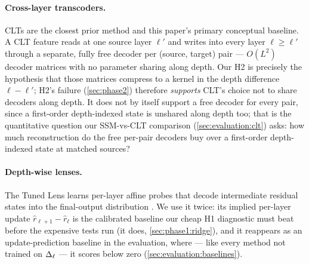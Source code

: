 \paragraph{Cross-layer transcoders.}
CLTs \citep{ameisen2025circuit} are the closest prior method and this paper's
primary conceptual baseline. A CLT feature reads at one source layer $\ell'$
and writes into every layer $\ell \ge \ell'$ through a separate, fully free
decoder per (source, target) pair --- $O(L^2)$ decoder matrices with no
parameter sharing along depth. Our H2 is precisely the hypothesis that those
matrices compress to a kernel in the depth difference $\ell-\ell'$; H2's
failure (\cref{sec:phase2}) therefore \emph{supports} CLT's choice not to
share decoders along depth. It does not by itself support a free decoder for
every pair, since a first-order depth-indexed state is unshared along depth
too; that is the quantitative question our SSM-vs-CLT comparison
(\cref{sec:evaluation:clt}) asks: how much
reconstruction do the free per-pair decoders buy over a first-order
depth-indexed state at matched sources?

\paragraph{Depth-wise lenses.}
The Tuned Lens learns per-layer affine probes that decode intermediate
residual states into the final-output distribution \citep{belrose2023tuned}.
We use it twice: its implied per-layer update
$\hat r_{\ell+1}-\hat r_\ell$ is the calibrated baseline our cheap H1
diagnostic must beat before the expensive tests run (it does,
\cref{sec:phase1:ridge}), and it reappears as an update-prediction baseline in
the evaluation, where --- like every method not trained on $\Delta_\ell$ --- it scores
below zero (\cref{sec:evaluation:baselines}).

